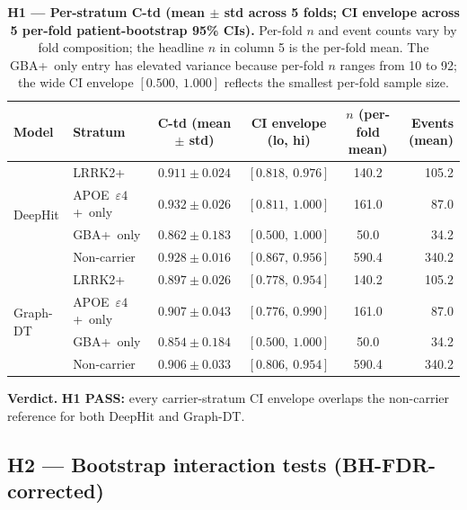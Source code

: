 \documentclass[11pt]{article}
\begin{document}
\begin{table}[h!]
\centering
\caption{\textbf{H1 --- Per-stratum C-td (mean $\pm$ std across 5 folds; CI envelope across 5 per-fold patient-bootstrap 95\% CIs).} Per-fold $n$ and event counts vary by fold composition; the headline $n$ in column 5 is the per-fold mean. The GBA+~only entry has elevated variance because per-fold $n$ ranges from 10 to 92; the wide CI envelope $[0.500,\ 1.000]$ reflects the smallest per-fold sample size.}
\label{tab:s3_h1_ctd}
\begin{tabular}{llcccr}
\toprule
\textbf{Model} & \textbf{Stratum} & \textbf{C-td (mean $\pm$ std)} & \textbf{CI envelope (lo, hi)} & \textbf{$n$ (per-fold mean)} & \textbf{Events (mean)} \\
\midrule
\multirow{4}{*}{DeepHit}
  & LRRK2+        & $0.911 \pm 0.024$ & $[0.818,\ 0.976]$ & 140.2 & 105.2 \\
  & APOE~$\varepsilon4$+~only & $0.932 \pm 0.026$ & $[0.811,\ 1.000]$ & 161.0 & 87.0 \\
  & GBA+~only     & $0.862 \pm 0.183$ & $[0.500,\ 1.000]$ & 50.0  & 34.2 \\
  & Non-carrier   & $0.928 \pm 0.016$ & $[0.867,\ 0.956]$ & 590.4 & 340.2 \\
\midrule
\multirow{4}{*}{Graph-DT}
  & LRRK2+        & $0.897 \pm 0.026$ & $[0.778,\ 0.954]$ & 140.2 & 105.2 \\
  & APOE~$\varepsilon4$+~only & $0.907 \pm 0.043$ & $[0.776,\ 0.990]$ & 161.0 & 87.0 \\
  & GBA+~only     & $0.854 \pm 0.184$ & $[0.500,\ 1.000]$ & 50.0  & 34.2 \\
  & Non-carrier   & $0.906 \pm 0.033$ & $[0.806,\ 0.954]$ & 590.4 & 340.2 \\
\bottomrule
\end{tabular}
\end{table}

\noindent\textbf{Verdict.} \textbf{H1 PASS:} every carrier-stratum CI envelope overlaps the non-carrier reference for both DeepHit and Graph-DT.

\subsection*{H2 --- Bootstrap interaction tests (BH-FDR-corrected)}
\end{document}
